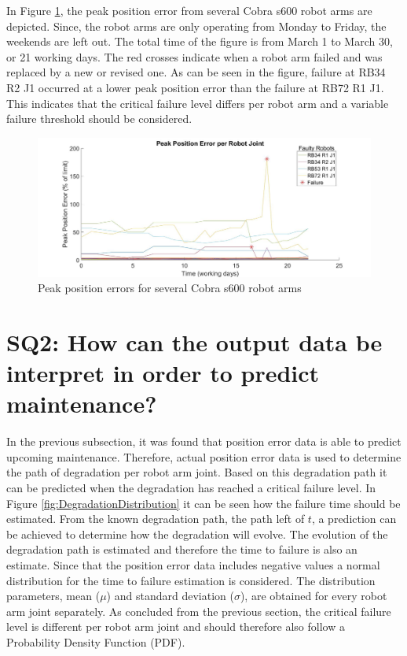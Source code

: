 In Figure \ref{fig:AllPosErrors}, the peak position error from several Cobra s600 robot arms are depicted. Since, the robot arms are only operating from Monday to Friday, the weekends are left out. The total time of the figure is from March 1 to March 30, or 21 working days. The red crosses indicate when a robot arm failed and was replaced by a new or revised one. As can be seen in the figure, failure at RB34 R2 J1 occurred at a lower peak position error than the failure at RB72 R1 J1. This indicates that the critical failure level differs per robot arm and a variable failure threshold should be considered. 
\begin{figure}[ht]
\centering
\includegraphics[width=\textwidth]{Figures/AllPeakPositionErrors20}
\caption[Peak position errors for several Cobra s600 robot arms]{Peak position errors for several Cobra s600 robot arms} \label{fig:AllPosErrors}
\end{figure}

\section{SQ2: How can the output data be interpret in order to predict maintenance?} \label{SQ2}
In the previous subsection, it was found that position error data is able to predict upcoming maintenance. Therefore, actual position error data is used to determine the path of degradation per robot arm joint. Based on this degradation path it can be predicted when the degradation has reached a critical failure level. In Figure \ref{fig:DegradationDistribution} it can be seen how the failure time should be estimated. From the known degradation path, the path left of $t$, a prediction can be achieved to determine how the degradation will evolve. The evolution of the degradation path is estimated and therefore the time to failure is also an estimate. Since that the position error data includes negative values a normal distribution for the time to failure estimation is considered. The distribution parameters, mean ($\mu$) and standard deviation ($\sigma$), are obtained for every robot arm joint separately. As concluded from the previous section, the critical failure level is different per robot arm joint and should therefore also follow a Probability Density Function (PDF).

